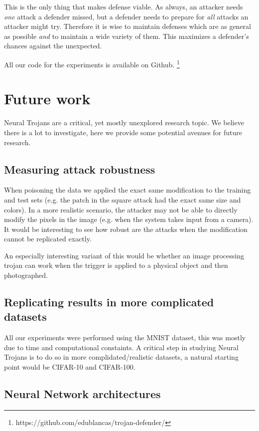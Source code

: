 \documentclass[letterpaper, 10 pt, conference]{ieeeconf}  %
\begin{document}
This is the only thing that makes defense viable.  As always, an
attacker needs \textit{one} attack a defender missed, but a defender
needs to prepare for \textit{all} attacks an attacker might try.
Therefore it is wise to maintain defenses which are as general as
possible \textit{and} to maintain a wide variety of them.  This
maximizes a defender's chances against the unexpected.

All our code for the experiments is available on Github. \footnote{https://github.com/edublancas/trojan-defender/}

\section{Future work}

Neural Trojans are a critical, yet mostly unexplored research topic. We believe
there is a lot to investigate, here we provide some potential avenues for
future research.

\subsection{Measuring attack robustness}

When poisoning the data we applied the exact same modification to the training
and test sets (e.g. the patch in the square attack had the exact same size and
colors). In a more realistic scenario, the attacker may not be able to directly
modify the pixels in the image (e.g. when the system takes input from a
camera). It would be interesting to see how robust are the attacks when the
modification cannot be replicated exactly.

An especially interesting variant of this would be whether an image
processing trojan can work when the trigger is applied to a physical
object and then photographed.

\subsection{Replicating results in more complicated datasets}

All our experiments were performed using the MNIST dataset, this was mostly due
to time and computational constaints. A critical step in studying Neural
Trojans is to do so in more complidated/realistic datasets, a natural starting
point would be CIFAR-10 and CIFAR-100.

\subsection{Neural Network architectures}
\end{document}
